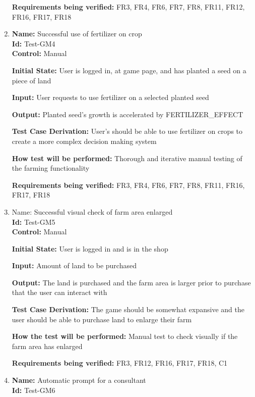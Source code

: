 \documentclass[12pt, titlepage]{article}
\begin{document}
\begin{enumerate}
\textbf{Requirements being verified:} FR3, FR4, FR6, FR7, FR8, FR11, FR12, FR16, FR17, FR18

\item{\textbf{Name:} Successful use of fertilizer on crop\\} %
\textbf{Id:} Test-GM4 \label{Test-GM4}\\

\textbf{Control:} Manual
					
\textbf{Initial State: }User is logged in, at game page, and has planted a seed on a piece of land
					
\textbf{Input:} User requests to use fertilizer on a selected planted seed
					
\textbf{Output: }Planted seed's growth is accelerated by FERTILIZER\_EFFECT

\textbf{Test Case Derivation:} User's should be able to use fertilizer on crops to create a more complex decision making system

\textbf{How test will be performed:} Thorough and iterative manual testing of the farming functionality

\textbf{Requirements being verified:} FR3, FR4, FR6, FR7, FR8, FR11, FR16, FR17, FR18

\item{Name: Successful visual check of farm area enlarged\\} %
\textbf{Id:} Test-GM5 \label{Test-GM5}\\

\textbf{Control:} Manual

\textbf{Initial State:} User is logged in and is in the shop

\textbf{Input:} Amount of land to be purchased

\textbf{Output:} The land is purchased and the farm area is larger prior to purchase that the user can interact with

\textbf{Test Case Derivation: }The game should be somewhat expansive and the user should be able to purchase land to enlarge their farm

\textbf{How the test will be performed: }Manual test to check visually if the farm area has enlarged

\textbf{Requirements being verified:} FR3, FR12, FR16, FR17, FR18, C1

\item{\textbf{Name:} Automatic prompt for a consultant\\} %
\textbf{Id:} Test-GM6 \label{Test-GM6} \\


\end{enumerate}
\end{document}

